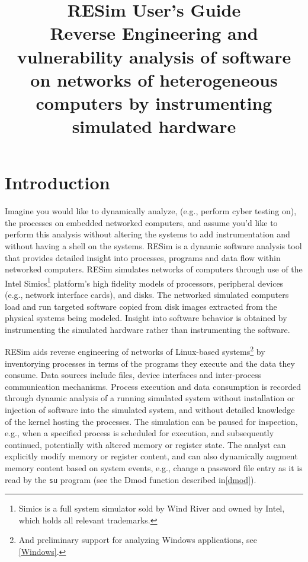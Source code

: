 \documentclass[titlepage]{article}
\begin{document}
\title {%
  RESim User's Guide \\
  \large Reverse Engineering and vulnerability analysis of software on networks of heterogeneous computers
   by instrumenting simulated hardware}
\maketitle
\tableofcontents
\newpage

\section{Introduction}
Imagine you would like to dynamically analyze, (e.g., perform cyber testing on), the processes on embedded networked computers, and assume 
you'd like to perform this analysis without altering the systems to add instrumentation and without having a shell on the systems.
RESim is a dynamic software analysis tool that provides detailed insight into processes, programs and data flow within networked computers.  RESim simulates networks of computers through use of the Intel Simics\footnote{ Simics is a full system simulator sold by Wind River and owned by Intel, which holds all relevant trademarks.} 
platform's high fidelity models of processors, peripheral devices (e.g., network interface cards), and disks.  The networked simulated computers load and run targeted software copied from disk images extracted from the physical systems being modeled.  Insight into software behavior is obtained by instrumenting the simulated hardware
rather than instrumenting the software.

RESim aids reverse engineering of networks of Linux-based systems\footnote{And preliminary support for analyzing Windows applications, see \ref{Windows}.} by inventorying processes in terms of the programs they execute and the data they consume.  Data sources include files, device interfaces and inter-process communication mechanisms.   Process execution and data consumption is recorded through dynamic analysis of a running simulated system without installation or injection of software into the simulated system, and without detailed knowledge of the kernel hosting the processes.
The simulation can be paused for inspection, e.g., when a specified process is scheduled for execution, and subsequently continued, potentially with altered memory or register state.  The analyst can explicitly modify memory or register content, and can also dynamically augment memory content
based on system events, e.g., change a password file entry as it is read by the {\tt su} program (see the Dmod function described in\ref{dmod}).
\end{document}
